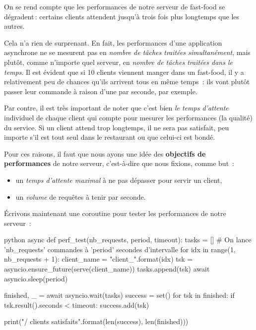 \documentclass[small]{zmdocument}
\begin{document}
On se rend compte que les performances de notre serveur de fast-food se
dégradent : certains clients attendent jusqu’à trois fois plus longtemps que
les autres.



Cela n’a rien de surprenant. En fait, les performances d’une application
asynchrone ne se mesurent pas en \textit{nombre de tâches traitées simultanément},
mais plutôt, comme n’importe quel serveur, en \textit{nombre de tâches traitées dans
le temps}. Il est évident que si 10 clients viennent manger dans un fast-food,
il y a relativement peu de chances qu’ils arrivent tous en même temps : ils
vont plutôt passer leur commande à raison d’une par seconde, par exemple.



Par contre, il est très important de noter que c’est bien \textit{le temps d’attente}
individuel de chaque client qui compte pour mesurer les performances (la
qualité) du service. Si un client attend trop longtemps, il ne sera pas
satisfait, peu importe s’il est tout seul dans le restaurant ou que celui-ci
est bondé.



Pour ces raisons, il faut que nous ayons une idée des \textbf{objectifs de
performances} de notre serveur, c’est-à-dire que nous fixions, comme but :



\begin{itemize}
\item\relax un \textit{temps d’attente maximal} à ne pas dépasser pour servir un client,
\item\relax un \textit{volume} de requêtes à tenir par seconde.
\end{itemize}


Écrivons maintenant une coroutine pour tester les performances
de notre serveur :



\begin{CodeBlock}{python}
async def perf_test(nb_requests, period, timeout):
    tasks = []
    # On lance 'nb_requests' commandes à 'period' secondes d'intervalle
    for idx in range(1, nb_requests + 1):
        client_name = "client_{}".format(idx)
        tsk = asyncio.ensure_future(serve(client_name))
        tasks.append(tsk)
        await asyncio.sleep(period)

    finished, _ = await asyncio.wait(tasks)
    success = set()
    for tsk in finished:
        if tsk.result().seconds < timeout:
            success.add(tsk)

    print("{}/{} clients satisfaits".format(len(success), len(finished)))
\end{CodeBlock}
\end{document}
